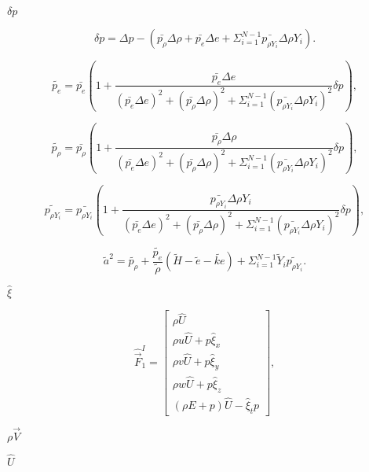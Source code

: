 \documentclass{article}
\begin{document}
$\delta p$
\pagebreak

\[ \begin{equation*} \delta p=\Delta p-\left(\bar{p_{\rho}}\Delta \rho+\bar{p_e}\Delta e+\Sigma_{i=1}^{N-1}\bar{p_{\rho Y_i}}\Delta \rho Y_i \right). \end{equation*} \]
\pagebreak

\[ \begin{equation*} \tilde{p_e}=\bar{p_e}\left(1+\frac{\bar{p_e}\Delta e}{(\bar{p_e}\Delta e)^2+(\bar{p_{\rho}}\Delta \rho)^2+\Sigma_{i=1}^{N-1}(\bar{p_{\rho Y_i}}\Delta \rho Y_i)^2 } \delta p\right), \end{equation*} \]
\pagebreak

\[ \begin{equation*} \tilde{p_{\rho}}=\bar{p_{\rho}}\left(1+\frac{\bar{p_{\rho}}\Delta \rho}{(\bar{p_e}\Delta e)^2+(\bar{p_{\rho}}\Delta \rho)^2+\Sigma_{i=1}^{N-1}(\bar{p_{\rho Y_i}}\Delta \rho Y_i)^2 } \delta p\right), \end{equation*} \]
\pagebreak

\[ \begin{equation*} \tilde{p_{\rho Y_i}}=\bar{p_{\rho Y_i}}\left(1+\frac{\bar{p_{\rho Y_i}}\Delta \rho Y_i}{(\bar{p_e}\Delta e)^2+(\bar{p_{\rho}}\Delta \rho)^2+\Sigma_{i=1}^{N-1}(\bar{p_{\rho Y_i}}\Delta \rho Y_i)^2 } \delta p\right), \end{equation*} \]
\pagebreak

\[ \begin{equation*} \tilde{a}^2=\tilde{p_\rho}+\frac{\tilde{p_e}}{\tilde{\rho}}(\tilde{H}-\tilde{e}-\tilde{ke})+\Sigma_{i=1}^{N-1}\tilde Y_i \tilde{p_{\rho Y_i}}. \end{equation*} \]
\pagebreak

$\hat{\xi}$
\pagebreak

\[ \hat{\vec{F}}^I_1 = \begin{bmatrix} \rho \hat{U} \\ \rho u \hat{U} + p\hat{\xi}_x \\ \rho v \hat{U} + p \hat{\xi}_y \\ \rho w \hat{U} + p\hat{\xi}_z \\ (\rho E + p)\hat{U} - \hat{\xi}_t p \end{bmatrix}, \]
\pagebreak

$\rho\vec{V}$
\pagebreak

$\hat{U}$
\pagebreak
\end{document}
